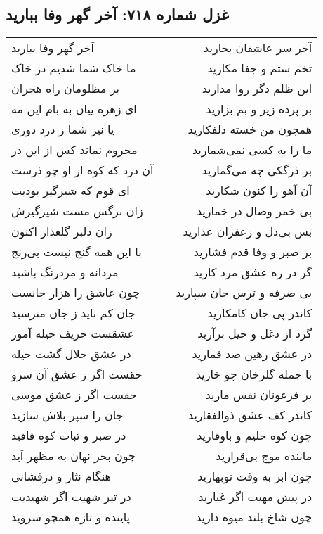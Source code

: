 \begin{center}
\section*{غزل شماره ۷۱۸: آخر گهر وفا ببارید}
\label{sec:0718}
\begin{longtable}{l p{0.5cm} r}
آخر گهر وفا ببارید
&&
آخر سر عاشقان بخارید
\\
ما خاک شما شدیم در خاک
&&
تخم ستم و جفا مکارید
\\
بر مظلومان راه هجران
&&
این ظلم دگر روا مدارید
\\
ای زهره ییان به بام این مه
&&
بر پرده زیر و بم بزارید
\\
یا نیز شما ز درد دوری
&&
همچون من خسته دلفکارید
\\
محروم نماند کس از این در
&&
ما را به کسی نمی‌شمارید
\\
آن درد که کوه از او چو ذرست
&&
بر ذرگکی چه می‌گمارید
\\
ای قوم که شیرگیر بودیت
&&
آن آهو را کنون شکارید
\\
زان نرگس مست شیرگیرش
&&
بی خمر وصال در خمارید
\\
زان دلبر گلعذار اکنون
&&
بس بی‌دل و زعفران عذارید
\\
با این همه گنج نیست بی‌رنج
&&
بر صبر و وفا قدم فشارید
\\
مردانه و مردرنگ باشید
&&
گر در ره عشق مرد کارید
\\
چون عاشق را هزار جانست
&&
بی صرفه و ترس جان سپارید
\\
جان کم ناید ز جان مترسید
&&
کاندر پی جان کامکارید
\\
عشقست حریف حیله آموز
&&
گرد از دغل و حیل برآرید
\\
در عشق حلال گشت حیله
&&
در عشق رهین صد قمارید
\\
حقست اگر ز عشق آن سرو
&&
با جمله گلرخان چو خارید
\\
حقست اگر ز عشق موسی
&&
بر فرعونان نفس مارید
\\
جان را سپر بلاش سازید
&&
کاندر کف عشق ذوالفقارید
\\
در صبر و ثبات کوه قافید
&&
چون کوه حلیم و باوقارید
\\
چون بحر نهان به مظهر آید
&&
ماننده موج بی‌قرارید
\\
هنگام نثار و درفشانی
&&
چون ابر به وقت نوبهارید
\\
در تیر شهیت اگر شهیدیت
&&
در پیش مهیت اگر غبارید
\\
پاینده و تازه همچو سروید
&&
چون شاخ بلند میوه دارید
\\

\end{longtable}
\end{center}
